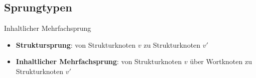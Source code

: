 \subsection{Sprungtypen}
\begin{frame}{Inhaltlicher Mehrfachsprung}
    \begin{itemize}
        \item<1-> \textbf{Struktursprung}: von Strukturknoten $v$ zu Strukturknoten $v'$
        \item<2-> \textbf{Inhaltlicher Mehrfachsprung}: von Strukturknoten $v$ über Wortknoten zu Strukturknoten $v'$
    \end{itemize}
\end{frame}
